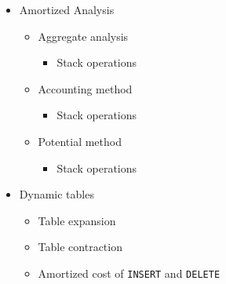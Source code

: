 \begin{itemize}
  \item Amortized Analysis
  \begin{itemize}
    \item Aggregate analysis
    \begin{itemize}
      \item Stack operations
    \end{itemize}
    \item Accounting method
    \begin{itemize}
      \item Stack operations
    \end{itemize}
    \item Potential method
    \begin{itemize}
      \item Stack operations
    \end{itemize}
  \end{itemize}
  \item Dynamic tables
  \begin{itemize}
    \item Table expansion
    \item Table contraction
    \item Amortized cost of \texttt{INSERT} and \texttt{DELETE}
  \end{itemize}
\end{itemize}

